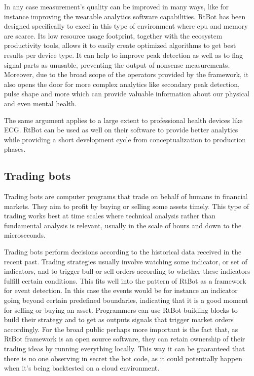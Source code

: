 \documentclass[preprint,1p,times]{elsarticle}
\begin{document}
In any case measurement's quality can be improved in many ways, like for instance improving the wearable 
analytics software capabilities. RtBot has been designed specifically to excel in this type of environment 
where cpu and memory are scarce. Its low resource usage footprint, together with the ecosystem productivity 
tools, allows it to easily create optimized algorithms to get best results per device type. It can help to 
improve peak detection as well as to flag signal parts as unusable, preventing the output of nonsense 
measurements. Moreover, due to the broad scope of the operators provided by the framework, it also opens 
the door for more complex analytics like secondary peak detection, pulse shape and more which can provide 
valuable information about our physical and even mental health.

The same argument applies to a large extent to professional health devices like ECG. RtBot can be used as 
well on their software to provide better analytics while providing a short development cycle from 
conceptualization to production phases.

\subsection{Trading bots}

Trading bots are computer programs that trade on behalf of humans in financial markets. They aim to profit by 
buying or selling some assets timely. This type of trading works best at time scales where technical analysis 
rather than fundamental analysis is relevant, usually in the scale of hours and down to the microseconds.

Trading bots perform decisions according to the historical data received in the recent past. Trading strategies 
usually involve watching some indicator, or set of indicators, and to trigger bull or sell orders according to 
whether these indicators fulfill certain conditions. This fits well into the pattern of RtBot as a framework for 
event detection. In this case the events would be for instance an indicator going beyond certain predefined 
boundaries, indicating that it is a good moment for selling or buying an asset. Programmers can use RtBot building 
blocks to build their strategy and to get as outputs signals that trigger market orders accordingly. For the broad 
public perhaps more important is the fact that, as RtBot framework is an open source software, they can retain 
ownership of their trading ideas by running everything locally. This way it can be guaranteed that there is no one 
observing in secret the bot code, as it could potentially happen when it’s being backtested on a cloud environment.
\end{document}
